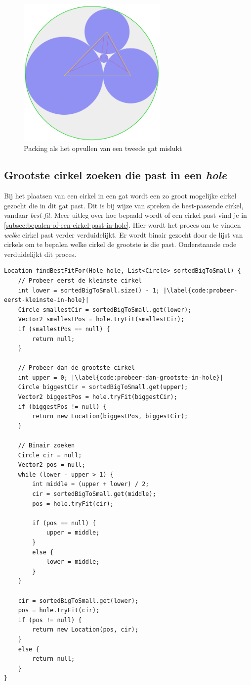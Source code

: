 \documentclass[12pt,a4paper,oneside]{book}
\begin{document}
\begin{figure}
  \centering
  \includegraphics[width=0.65\textwidth]{voorbeeld-gat-stap-3alt.png}
  \caption{Packing als het opvullen van een tweede gat mislukt} \label{fig:voorbeeld-gat-stap-3alt} 
\end{figure}

\subsection{Grootste cirkel zoeken die past in een \textit{hole}} \label{sec:grootste-cirkel-zoeken-die-past-in-een-hole}

Bij het plaatsen van een cirkel in een gat wordt een zo groot mogelijke cirkel gezocht die in dit gat past.
Dit is bij wijze van spreken de best-passende cirkel, vandaar \textit{best-fit}.
Meer uitleg over hoe bepaald wordt of een cirkel past vind je in \autoref{subsec:bepalen-of-een-cirkel-past-in-hole}.
Hier wordt het proces om te vinden \textit{welke} cirkel past verder verduidelijkt.
Er wordt binair gezocht door de lijst van cirkels om te bepalen welke cirkel de grootste is die past.
Onderstaande code verduidelijkt dit proces.

\begin{lstlisting}
Location findBestFitFor(Hole hole, List<Circle> sortedBigToSmall) {
	// Probeer eerst de kleinste cirkel
	int lower = sortedBigToSmall.size() - 1; |\label{code:probeer-eerst-kleinste-in-hole}|
	Circle smallestCir = sortedBigToSmall.get(lower);
	Vector2 smallestPos = hole.tryFit(smallestCir);
	if (smallestPos == null) {
		return null;
	}

	// Probeer dan de grootste cirkel
	int upper = 0; |\label{code:probeer-dan-grootste-in-hole}|
	Circle biggestCir = sortedBigToSmall.get(upper);
	Vector2 biggestPos = hole.tryFit(biggestCir);
	if (biggestPos != null) {
		return new Location(biggestPos, biggestCir);
	}

	// Binair zoeken
	Circle cir = null;
	Vector2 pos = null;
	while (lower - upper > 1) {
		int middle = (upper + lower) / 2;
		cir = sortedBigToSmall.get(middle);
		pos = hole.tryFit(cir);

		if (pos == null) {
			upper = middle;
		}
		else {
			lower = middle;
		}
	}

	cir = sortedBigToSmall.get(lower);
	pos = hole.tryFit(cir);
	if (pos != null) {
		return new Location(pos, cir);
	}
	else {
		return null;
	}
}
\end{lstlisting}
\end{document}
